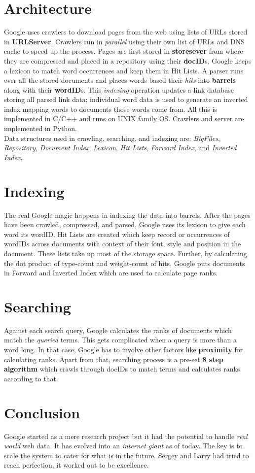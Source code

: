 \documentclass[a4paper, 10pt]{article}
\begin{document}
\section{Architecture}
Google uses crawlers to download pages from the web using lists of URLs stored in \textbf{URLServer}. Crawlers run in \textit{parallel} using their own list of URLs and DNS cache to speed up the process. Pages are first stored in \textbf{storesever} from where they are compressed and placed in a repository using their \textbf{docID}s. Google keeps a lexicon to match word occurrences and keep them in Hit Lists. A parser runs over all the stored documents and places words based their \textit{hits} into \textbf{barrels} along with their \textbf{wordID}s. This \textit{indexing} operation updates a link database storing all parsed link data; individual word data is used to generate an inverted index mapping words to documents those words come from. All this is implemented in C/C++ and runs on UNIX family OS. Crawlers and server are implemented in Python.\\
Data structures used in crawling, searching, and indexing are: \textit{BigFiles}, \textit{Repository}, \textit{Document Index}, \textit{Lexicon}, \textit{Hit Lists}, \textit{Forward Index}, and \textit{Inverted Index}.
\section{Indexing}
The real Google magic happens in indexing the data into barrels. After the pages have been crawled, compressed, and parsed, Google uses its lexicon to give each word its wordID. Hit Lists are created which keep record or occurrences of wordIDs across documents with context of their font, style and position in the document. These lists take up most of the storage space. Further, by calculating the dot product of type-count and weight-count of hits, Google puts documents in Forward and Inverted Index which are used to calculate page ranks.
\section{Searching}
Against each search query, Google calculates the ranks of documents which match the \textit{queried} terms. This gets complicated when a query is more than a word long. In that case, Google has to involve other factors like \textbf{proximity} for calculating ranks. Apart from that, searching process is a pre-set \textbf{8 step algorithm} which crawls through docIDs to match terms and calculates ranks according to that.
\section{Conclusion}
Google started as a mere research project but it had the potential to handle \textit{real world} web data. It has evolved into an \textit{internet giant} as of today. The key is to scale the system to cater for what is in the future. Sergey and Larry had tried to reach perfection, it worked out to be excellence.
\end{document}
